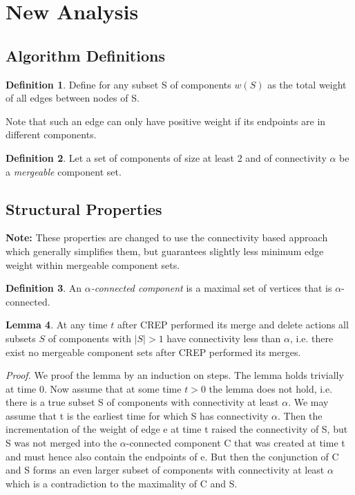 \documentclass[xcolor=dvipsnames, tikz, 11pt]{article}
\newcommand{\nl}{\newline}
\newcommand{\crep}{C{\scriptsize REP}}
\theoremstyle{definition}
\newtheorem{defi}{Definition}
\newtheorem{lemma}[defi]{Lemma}
\begin{document}
	

\section{New Analysis}

\subsection{Algorithm Definitions}

\begin{defi}
	Define for any subset S of components $w(S)$ as the total weight of all edges between nodes of S.
\end{defi}
Note that such an edge can only have positive weight if its endpoints are in different components.

\begin{defi}
	Let a set of components of size at least 2 and of connectivity $\alpha$ be a \textit{mergeable} component set.	
\end{defi}


\subsection{Structural Properties}


\textbf{Note:} These properties are changed to use the connectivity based approach which generally simplifies them, but guarantees slightly less minimum edge weight within mergeable component sets.
\begin{defi}
	An $\alpha$\textit{-connected component} is a maximal set of vertices that is $\alpha$-connected.
\end{defi}

\begin{lemma}
	At any time $t$ after \crep{} performed its merge and delete actions all subsets $S$ of components with $|S|>1$ have connectivity less than $\alpha$, i.e. there exist no mergeable component sets after \crep{} performed its merges.
\end{lemma}

\textit{Proof.} We proof the lemma by an induction on steps. The lemma holds trivially at time 0.\nl
Now assume that at some time $t>0$ the lemma does not hold, i.e. there is a true subset S of components with connectivity at least $\alpha$. We may assume that t is the earliest time for which S has connectivity $\alpha$.\nl 
Then the incrementation of the weight of edge e at time t raised the connectivity of S, but S was not merged into the $\alpha$-connected component C that was created at time t and must hence also contain the endpoints of e. But then the conjunction of C and S forms an even larger subset of components with connectivity at least $\alpha$ which is a contradiction to the maximality of C and S. 
\end{document}
